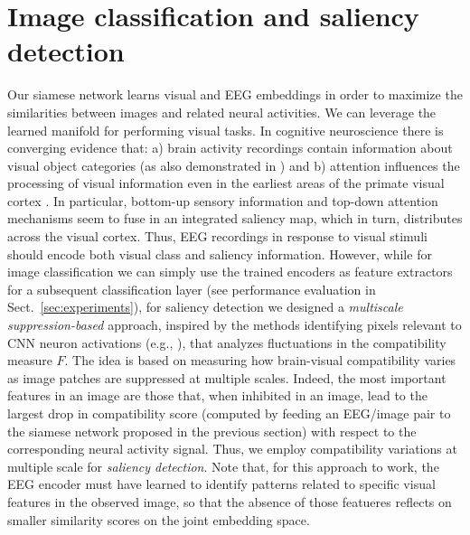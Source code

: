 \documentclass[10pt,journal,compsoc,twocolumn]{IEEEtran}
\begin{document}
\section{Image classification and saliency detection}\label{sec:saliency_method}
Our siamese network learns visual and EEG embeddings in order to maximize the similarities between  images and related neural activities. We can leverage the learned manifold for performing visual tasks. 
In cognitive neuroscience there is converging evidence that: a)  brain activity recordings contain information about visual object categories (as also demonstrated in \cite{Spampinato2016deep}) and b) attention influences the processing of visual information even in the earliest areas of the primate visual cortex \cite{TREUE2003428}. In particular, bottom-up sensory information and top-down attention mechanisms seem to fuse in an integrated saliency map, which in turn, distributes across the visual cortex. 
Thus, EEG recordings in response to visual stimuli should encode both visual class and saliency information. However, while for image classification we can simply use the trained encoders as feature extractors for a subsequent classification layer (see performance evaluation in Sect.~\ref{sec:experiments}), for saliency detection we designed a \textit{multiscale suppression-based} approach, inspired by the methods identifying pixels relevant to CNN neuron activations (e.g., \cite{zeiler2014visualizing}), that analyzes fluctuations in the compatibility measure $F$. The idea is based on measuring how brain-visual compatibility varies as image patches are suppressed at multiple scales. Indeed, the most important features in an image are those that, when inhibited in an image, lead to the largest drop in compatibility score (computed by feeding an EEG/image pair to the siamese network proposed in the previous section) with respect to the corresponding neural activity signal. Thus, we employ compatibility variations at multiple scale for \emph{saliency detection}. Note that, for this approach to work, the EEG encoder must have learned to identify patterns related to specific visual features in the observed image, so that the absence of those featueres reflects on smaller similarity scores on the joint embedding space.
\end{document}
